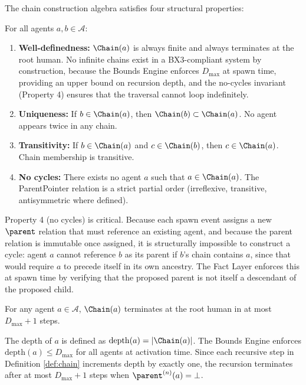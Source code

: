 The chain construction algebra satisfies four structural properties:

\begin{property}
\label{prop:chain_properties}
For all agents $a, b \in \mathcal{A}$:
\begin{enumerate}
    \item \textbf{Well-definedness:} $\Chain(a)$ is always finite and always terminates at the root human. No infinite chains exist in a BX3-compliant system by construction, because the Bounds Engine enforces $D_{\max}$ at spawn time, providing an upper bound on recursion depth, and the no-cycles invariant (Property 4) ensures that the traversal cannot loop indefinitely.
    \item \textbf{Uniqueness:} If $b \in \Chain(a)$, then $\Chain(b) \subset \Chain(a)$. No agent appears twice in any chain.
    \item \textbf{Transitivity:} If $b \in \Chain(a)$ and $c \in \Chain(b)$, then $c \in \Chain(a)$. Chain membership is transitive.
    \item \textbf{No cycles:} There exists no agent $a$ such that $a \in \Chain(a)$. The ParentPointer relation is a strict partial order (irreflexive, transitive, antisymmetric where defined).
\end{enumerate}
\end{property}

Property 4 (no cycles) is critical. Because each spawn event assigns a new $\parent$ relation that must reference an existing agent, and because the parent relation is immutable once assigned, it is structurally impossible to construct a cycle: agent $a$ cannot reference $b$ as its parent if $b$'s chain contains $a$, since that would require $a$ to precede itself in its own ancestry. The Fact Layer enforces this at spawn time by verifying that the proposed parent is not itself a descendant of the proposed child.

\begin{prop}
\label{prop:finite_termination}
For any agent $a \in \mathcal{A}$, $\Chain(a)$ terminates at the root human in at most $D_{\max} + 1$ steps.
\end{prop}

\begin{Proof}
The depth of $a$ is defined as $\mathrm{depth}(a) = |\Chain(a)|$. The Bounds Engine enforces $\mathrm{depth}(a) \leq D_{\max}$ for all agents at activation time. Since each recursive step in Definition \ref{def:chain} increments depth by exactly one, the recursion terminates after at most $D_{\max} + 1$ steps when $\parent^{(n)}(a) = \bot$.
\end{Proof}

